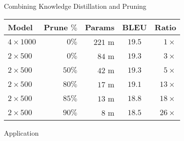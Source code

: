\begin{frame}{Combining Knowledge Distillation and Pruning}
\air
\air
\begin{table}[t] \label{prune}
\centering
\small
\begin{tabular}{l  r  r c  r }
\toprule
Model & Prune $\%$ & Params & BLEU & Ratio \\
\midrule 
$4 \times 1000$ & $0\%$ &$221$ m& $19.5$& $1 \times$   \\
$2 \times 500$ &  $0\%$& $84$ m& $19.3$& $3 \times$   \\
$2 \times 500$ & $50\%$& $42$ m&  $19.3$ & $5 \times$ \\
$2 \times 500$ &  $80\%$& $17$ m&  $19.1$ & $13 \times$ \\
$2 \times 500$ &  $85\%$& $13$ m&  $18.8$ & $18 \times$ \\
$2 \times 500$ &  $90\%$& $8$ m &  $18.5$  & $26 \times$ \\

\bottomrule
\end{tabular}
\end{table}
\end{frame}


\begin{frame}{Application}
  
  \begin{center}
  \end{center}
\end{frame}

\begin{frame}{}
  
\end{frame}
